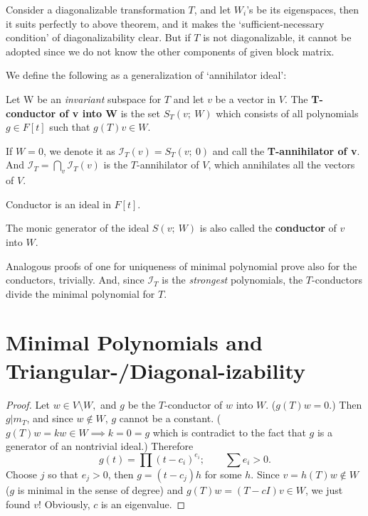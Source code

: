 \begin{ex}
  Consider a diagonalizable transformation $T$, and let $W_i$'s be its eigenspaces, then it suits perfectly to above theorem, and it makes the `sufficient-necessary condition' of diagonalizability clear. But if $T$ is not diagonalizable, it cannot be adopted since we do not know the other components of given block matrix.
\end{ex}

We define the following as a generalization of `annihilator ideal':
\begin{defn} Let W be an \textit{invariant} subspace for $T$ and let $v$ be a vector in $V$. The \textbf{T-conductor of v into W} is the set $S_T(v; ~W)$ which consists of all polynomials $g\in F[t]$ such that $g(T) v \in W.$

If $W=0$, we denote it as $\mathcal I_T(v) = S_T(v;~0)$ and call the \textbf{T-annihilator of v}. And $\mathcal I_T = \bigcap_v \mathcal I_T(v)$ is the $T$-annihilator of $V$, which annihilates all the vectors of $V$.
\end{defn}
\begin{prop}Conductor is an ideal in $F[t]$.\end{prop}
\begin{defn} The monic generator of the ideal $S(v;~W)$ is also called the \textbf{conductor} of $v$ into $W$.
\end{defn}

Analogous proofs of one for uniqueness of minimal polynomial prove also for the conductors, trivially. And, since $\mathcal I_T$ is the \textit{strongest} polynomials, the $T$-conductors divide the minimal polynomial for $T$.

\section{Minimal Polynomials and Triangular-/Diagonal-izability}
\begin{proof}Let $w\in V\setminus W,$ and $g$ be the $T$-conductor of $w$ into $W$. ($g(T)w = 0.$) Then $g | m_T$, and since $w \not\in W$, $g $ cannot be a constant. ($g(T)w = kw \in W \implies k = 0 = g$ which is contradict to the fact that $g$ is a generator of an nontrivial ideal.) Therefore $$g(t) = \prod(t-c_i)^{e_i}; \qquad \sum e_i > 0.$$ Choose $j$ so that $e_j > 0$, then $g = (t-c_j) h$ for some $h$. Since $v=h(T)w \not \in W$ ($g$ is minimal in the sense of degree) and $g(T)w = (T-cI)v \in W$, we just found $v$! Obviously, $c$ is an eigenvalue.
\end{proof}

